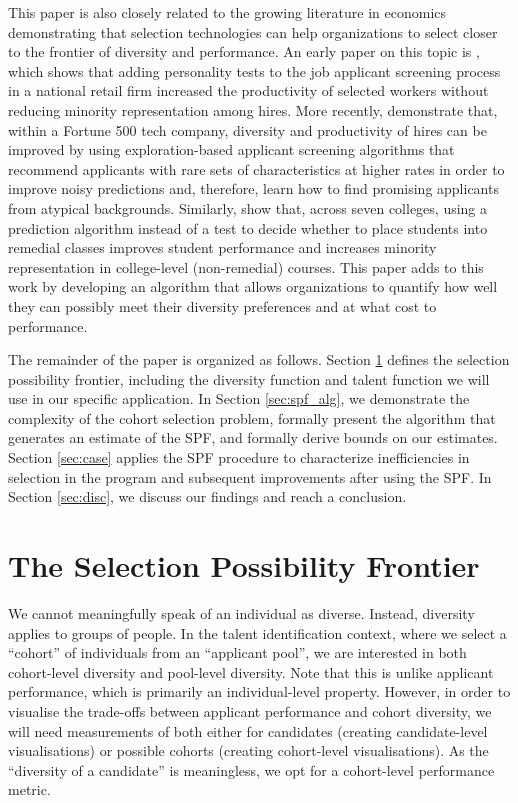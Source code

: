 This paper is also closely related to the growing literature in economics demonstrating that selection technologies can help organizations to select closer to the frontier of diversity and performance. An early paper on this topic is \textcite{autor2008does}, which shows that adding personality tests to the job applicant screening process in a national retail firm increased the productivity of selected workers without reducing minority representation among hires. More recently, \textcite{li2020hiring} demonstrate that,  within a Fortune 500 tech company, diversity and productivity of hires can be improved by using exploration-based applicant screening algorithms that recommend applicants with rare sets of characteristics at higher rates in order to improve noisy predictions and, therefore, learn how to find promising applicants from atypical backgrounds. Similarly, \textcite{bergman2021seven} show that, across seven colleges, using a prediction algorithm instead of a test to decide whether to place students into remedial classes improves student performance and increases minority representation in college-level (non-remedial) courses. This paper adds to this work by developing an algorithm that allows organizations to quantify how well they can possibly meet their diversity preferences and at what cost to performance. 

The remainder of the paper is organized as follows. Section \ref{sec:spf_def} defines the selection possibility frontier, including the diversity function and talent function we will use in our specific application. In Section \ref{sec:spf_alg}, we demonstrate the complexity of the cohort selection problem, formally present the algorithm that generates an estimate of the SPF, and formally derive bounds on our estimates. Section \ref{sec:case} applies the SPF procedure to characterize inefficiencies in selection in the program and subsequent improvements after using the SPF. In Section \ref{sec:disc}, we discuss our findings and reach a conclusion. 

\section{The Selection Possibility Frontier}\label{sec:spf_def}
We cannot meaningfully speak of an individual as diverse. Instead, diversity applies to groups of people. In the talent identification context, where we select a ``cohort'' of individuals from an ``applicant pool'', we are interested in both cohort-level diversity and pool-level diversity. Note that this is unlike applicant performance, which is primarily an individual-level property. However, in order to visualise the trade-offs between applicant performance and cohort diversity, we will need measurements of both either for candidates (creating candidate-level visualisations) or possible cohorts (creating cohort-level visualisations). As the ``diversity of a candidate'' is meaningless, we opt for a cohort-level performance metric.

